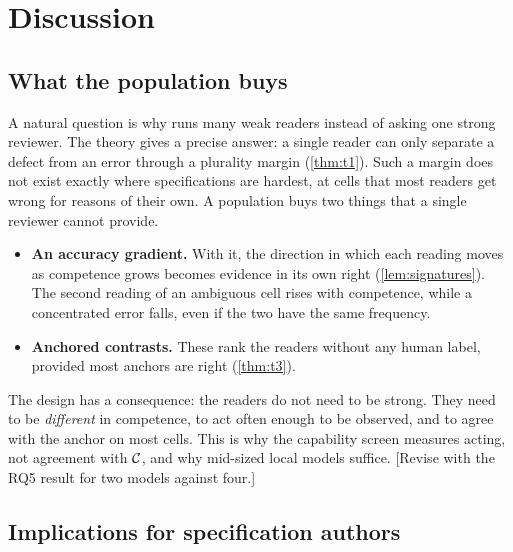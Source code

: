 \section{Discussion}
\label{sec:discussion}


\subsection{What the population buys}

A natural question is why \specdx runs many weak readers instead of asking one strong reviewer. The theory gives a precise answer: a single reader can only separate a defect from an error through a plurality margin (\cref{thm:t1}). Such a margin does not exist exactly where specifications are hardest, at cells that most readers get wrong for reasons of their own. A population buys two things that a single reviewer cannot provide.
\begin{itemize}[leftmargin=*]
\item \textbf{An accuracy gradient.} With it, the direction in which each reading moves as competence grows becomes evidence in its own right (\cref{lem:signatures}). The second reading of an ambiguous cell rises with competence, while a concentrated error falls, even if the two have the same frequency.
\item \textbf{Anchored contrasts.} These rank the readers without any human label, provided most anchors are right (\cref{thm:t3}).
\end{itemize}
The design has a consequence: the readers do not need to be strong. They need to be \emph{different} in competence, to act often enough to be observed, and to agree with the anchor on most cells. This is why the capability screen measures acting, not agreement with $\mathcal{C}$, and why mid-sized local models suffice. [Revise with the RQ5 result for two models against four.]

\subsection{Implications for specification authors}

